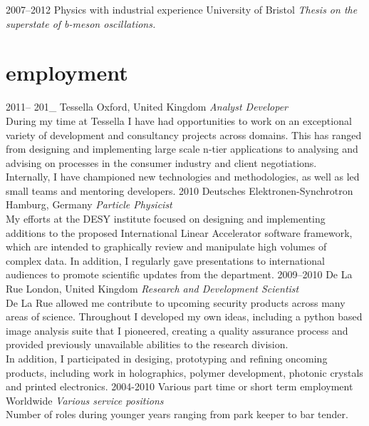 \documentclass[]{friggeri-cv} %
\begin{document}
\begin{entrylist}
\entry
{2007--2012}
{Physics {\normalfont with industrial experience}}
{University of Bristol}
{\emph{Thesis on the superstate of b-meson oscillations.} }
\end{entrylist}


\section{employment}

\begin{entrylist}
\entry
{2011-- 201\_ }
{Tessella}
{Oxford, United Kingdom}
{\emph{Analyst Developer} \\
During my time at Tessella I have had opportunities to work on an exceptional variety of development and consultancy projects across domains. This has ranged from designing and implementing large scale n-tier applications to analysing and advising on processes in the consumer industry and client negotiations.\\
Internally, I have championed new technologies and methodologies, as well as led small teams and mentoring developers.} 
\entry
{2010}
{Deutsches Elektronen-Synchrotron}
{Hamburg, Germany}
{\emph{Particle Physicist} \\
My efforts at the DESY  institute focused on designing and implementing additions to
the proposed International Linear Accelerator software framework, which are intended to graphically review
and manipulate high volumes of complex data. In addition, I regularly gave presentations to international audiences to promote scientific updates from the department.} 
\entry
{2009--2010}
{De La Rue}
{London, United Kingdom}
{\emph{Research and Development Scientist} \\
De La Rue allowed me contribute to upcoming security
products across many areas of science. Throughout I developed my own ideas, including a python based image analysis suite that I pioneered, creating a quality assurance process and provided previously unavailable abilities to the research division. \\
In addition, I participated in desiging, prototyping and refining oncoming products, including  work in holographics, polymer development, photonic crystals and printed electronics.}
\entry
{2004-2010}
{Various part time or short term employment}
{Worldwide}
{\emph{Various service positions} \\
Number of roles during younger years ranging from park keeper to bar tender.}
\end{entrylist}
\end{document}
